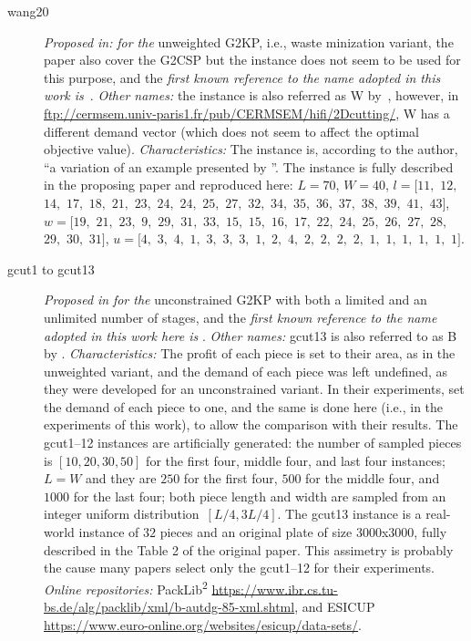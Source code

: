 \documentclass[ppgc,tese,english,formais,babel]{iiufrgs}
\begin{document}
\begin{description}
\item [wang20] \emph{Proposed in:} \citet{wang:1983} \emph{for the} unweighted G2KP, i.e., waste minization variant, the paper also cover the G2CSP but the instance does not seem to be used for this purpose, and the \emph{first known reference to the name adopted in this work is}~\citet{fekete:1997}. \emph{Other names:} the instance is also referred as W by~\citet{fayard:1998}, however, in \url{ftp://cermsem.univ-paris1.fr/pub/CERMSEM/hifi/2Dcutting/}, W has a different demand vector (which does not seem to affect the optimal objective value). \emph{Characteristics:} The instance is, according to the author, ``a variation of an example presented by \citet{cw:1977}''. The instance is fully described in the proposing paper and reproduced here: \(L = 70\), \(W = 40\), \(l = [11,\) \(12,\) \(14,\) \(17,\) \(18,\) \(21,\) \(23,\) \(24,\) \(24,\) \(25,\) \(27,\) \(32,\) \(34,\) \(35,\) \(36,\) \(37,\) \(38,\) \(39,\) \(41,\) \(43]\), \(w = [19,\) \(21,\) \(23,\) \(9,\) \(29,\) \(31,\) \(33,\) \(15,\) \(15,\) \(16,\) \(17,\) \(22,\) \(24,\) \(25,\) \(26,\) \(27,\) \(28,\) \(29,\) \(30,\) \(31]\), \(u = [4,\) \(3,\) \(4,\) \(1,\) \(3,\) \(3,\) \(3,\) \(1,\) \(2,\) \(4,\) \(2,\) \(2,\) \(2,\) \(2,\) \(1,\) \(1,\) \(1,\) \(1,\) \(1,\) \(1]\).
\item [gcut1 to gcut13] \emph{Proposed in} \citet{beasley:1985:guillotine} \emph{for the} unconstrained G2KP with both a limited and an unlimited number of stages, and the \emph{first known reference to the name adopted in this work here is} \citet{martello:1998}. \emph{Other names:} gcut13 is also referred to as B by \citet{fekete:1997}. \emph{Characteristics: } The profit of each piece is set to their area, as in the unweighted variant, and the demand of each piece was left undefined, as they were developed for an unconstrained variant. In their experiments, \citet{furini:2016} set the demand of each piece to one, and the same is done here (i.e., in the experiments of this work), to allow the comparison with their results. The gcut1--12 instances are artificially generated: the number of sampled pieces is \([10, 20, 30, 50]\) for the first four, middle four, and last four instances; \(L = W\) and they are \(250\) for the first four, \(500\) for the middle four, and \(1000\) for the last four; both piece length and width are sampled from an integer uniform distribution~\([L/4, 3L/4]\). The gcut13 instance is a real-world instance of \(32\) pieces and an original plate of size \(3000\)x\(3000\), fully described in the Table 2 of the original paper. This assimetry is probably the cause many papers select only the gcut1--12 for their experiments. \emph{Online repositories: } PackLib\textsuperscript{2} \url{https://www.ibr.cs.tu-bs.de/alg/packlib/xml/b-autdg-85-xml.shtml}, and ESICUP \url{https://www.euro-online.org/websites/esicup/data-sets/}.

\end{description}
\end{document}
